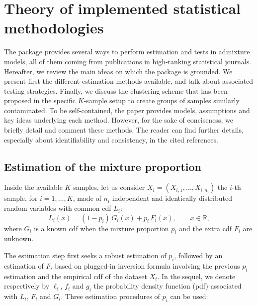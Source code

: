\section{Theory of implemented statistical methodologies}\label{sec:methodo}

The  package \citep{admix:2025} provides several ways to perform estimation and tests in admixture models, all of them coming from publications in high-ranking statistical journals. Hereafter, we review the main ideas on which the package is grounded. We present first the different estimation methods available, and talk about associated testing strategies. Finally, we discuss the clustering scheme that has been proposed in the specific \(K\)-sample setup to create groups of samples similarly contaminated. To be self-contained, the paper provides models, assumptions and key ideas underlying each method. However, for the sake of conciseness, we briefly detail and comment these methods. The reader can find further details, especially about identifiability and consistency, in the cited references.

\subsection{Estimation of the mixture proportion}\label{sec:estimTechniques}

Inside the available \(K\) samples, let us consider \(X_i=(X_{i,1}, \dots, X_{i,n_i})\) the \(i\)-th sample, for \(i=1,\dots,K\), made of \(n_i\) independent and identically distributed random variables with common cdf \(L_i\):
\begin{equation}
  L_i(x) = (1-p_i) \, G_i(x) + p_i \, F_i(x), \qquad x \in \mathbb{R},
\label{eq:ithAdmixture}
\end{equation}
where \(G_i\) is a known cdf when the mixture proportion \(p_i\) and the extra cdf \(F_i\) are unknown.

The estimation step first seeks a robust estimation of \(p_i\), followed by an estimation of \(F_i\) based on plugged-in inversion formula involving the previous \(p_i\) estimation and the empirical cdf of the dataset \(X_i\). In the sequel, we denote respectively by \(\ell_i\), \(f_i\) and \(g_i\) the probability density function (pdf) associated with \(L_i\), \(F_i\) and \(G_i\). Three estimation procedures of \(p_i\) can be used:


